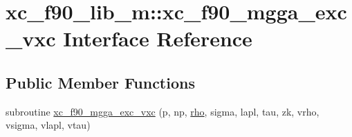 \hypertarget{interfacexc__f90__lib__m_1_1xc__f90__mgga__exc__vxc}{\section{xc\-\_\-f90\-\_\-lib\-\_\-m\-:\-:xc\-\_\-f90\-\_\-mgga\-\_\-exc\-\_\-vxc Interface Reference}
\label{interfacexc__f90__lib__m_1_1xc__f90__mgga__exc__vxc}
}
\subsection*{Public Member Functions}
\begin{DoxyCompactItemize}
\item 
subroutine \hyperlink{interfacexc__f90__lib__m_1_1xc__f90__mgga__exc__vxc_af2b64ac478ef092ee2408c0689135ce2}{xc\-\_\-f90\-\_\-mgga\-\_\-exc\-\_\-vxc} (p, np, \hyperlink{md_8h_a52b35cee8a5db846ce98f4904e1c8b13}{rho}, sigma, lapl, tau, zk, vrho, vsigma, vlapl, vtau)
\end{DoxyCompactItemize}


